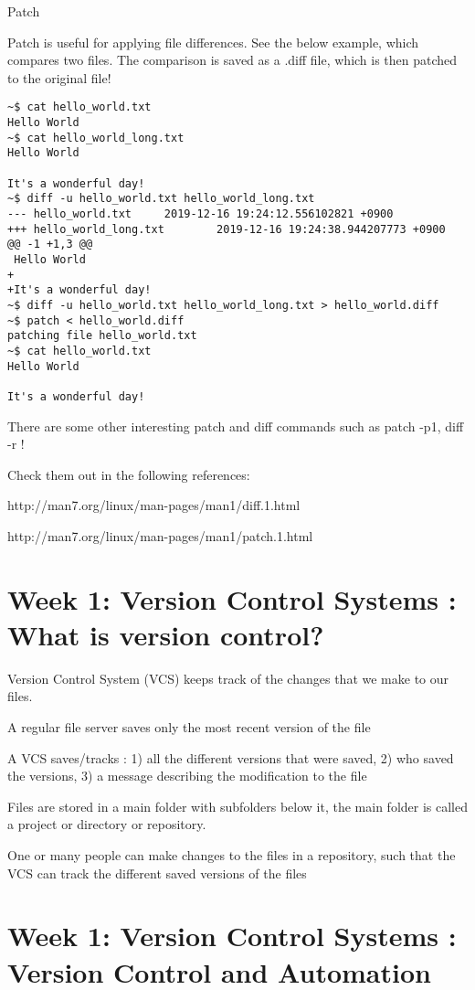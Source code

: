 \documentclass[11pt, onecolumn]{article}
\begin{document}
Patch

Patch is useful for applying file differences. See the below example, which compares two files. The comparison is saved as a .diff file, which is then patched to the original file!
\begin{verbatim}
~$ cat hello_world.txt 
Hello World
~$ cat hello_world_long.txt 
Hello World

It's a wonderful day!
~$ diff -u hello_world.txt hello_world_long.txt 
--- hello_world.txt     2019-12-16 19:24:12.556102821 +0900
+++ hello_world_long.txt        2019-12-16 19:24:38.944207773 +0900
@@ -1 +1,3 @@
 Hello World
+
+It's a wonderful day!
~$ diff -u hello_world.txt hello_world_long.txt > hello_world.diff
~$ patch < hello_world.diff 
patching file hello_world.txt
~$ cat hello_world.txt 
Hello World

It's a wonderful day!
\end{verbatim}

There are some other interesting patch and diff commands such as patch -p1, diff -r !

Check them out in the following references:

http://man7.org/linux/man-pages/man1/diff.1.html

http://man7.org/linux/man-pages/man1/patch.1.html


\section{Week 1: Version Control Systems : What is version control?}

Version Control System (VCS) keeps track of the changes that we make to our files.

A regular file server saves only the most recent version of the file 

A VCS saves/tracks : 1) all the different versions that were saved, 2) who saved the versions, 3) a message describing the modification to the file

Files are stored in a main folder with subfolders below it, the main folder is called a project or directory or repository. 

One or many people can make changes to the files in a repository, such that the VCS can track the different saved versions of the files


\section{Week 1: Version Control Systems : Version Control and Automation}
\end{document}
